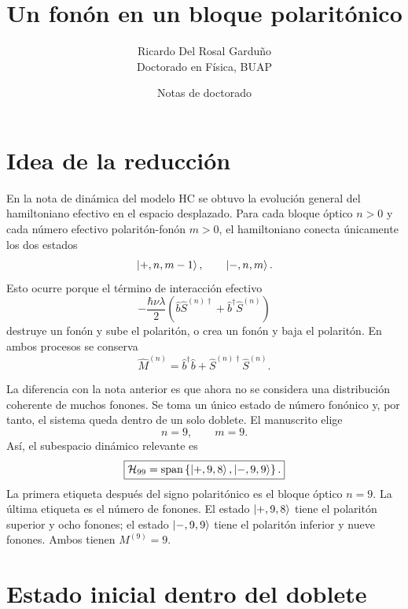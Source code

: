 \documentclass[11pt]{article}
\title{Un fon\'on en un bloque polarit\'onico}
\author{Ricardo Del Rosal Gardu\~no \\ \small Doctorado en F\'isica, BUAP}
\date{Notas de doctorado}
\begin{document}
\maketitle

\tableofcontents
\bigskip

\section{Idea de la reducci\'on}

En la nota de din\'amica del modelo HC se obtuvo la evoluci\'on general del
hamiltoniano efectivo en el espacio desplazado. Para cada bloque \'optico
$n>0$ y cada n\'umero efectivo polarit\'on-fon\'on $m>0$, el hamiltoniano
conecta \'unicamente los dos estados
\begin{equation}
  \ket{+,n,m-1},
  \qquad
  \ket{-,n,m}.
\end{equation}
Esto ocurre porque el t\'ermino de interacci\'on efectivo
\begin{equation}
  -\frac{\hbar\nu\lambda}{2}
  \left(
  \hat b\hat S^{(n)\dagger}
  +
  \hat b^\dagger\hat S^{(n)}
  \right)
\end{equation}
destruye un fon\'on y sube el polarit\'on, o crea un fon\'on y baja el
polarit\'on. En ambos procesos se conserva
\begin{equation}
  \boxed{
  \hat M^{(n)}
  =
  \hat b^\dagger\hat b+\hat S^{(n)\dagger}\hat S^{(n)}.
  }
\end{equation}

La diferencia con la nota anterior es que ahora no se considera una
distribuci\'on coherente de muchos fonones. Se toma un \'unico estado de
n\'umero fon\'onico y, por tanto, el sistema queda dentro de un solo doblete.
El manuscrito elige
\begin{equation}
  \boxed{
  n=9,
  \qquad
  m=9.
  }
\end{equation}
As\'i, el subespacio din\'amico relevante es
\begin{equation}
  \boxed{
  \mathcal H_{99}
  =
  \operatorname{span}
  \left\{
  \ket{+,9,8},
  \ket{-,9,9}
  \right\}.
  }
\end{equation}
La primera etiqueta despu\'es del signo polarit\'onico es el bloque \'optico
$n=9$. La \'ultima etiqueta es el n\'umero de fonones. El estado
$\ket{+,9,8}$ tiene el polarit\'on superior y ocho fonones; el estado
$\ket{-,9,9}$ tiene el polarit\'on inferior y nueve fonones. Ambos tienen
$M^{(9)}=9$.

\section{Estado inicial dentro del doblete}
\end{document}
